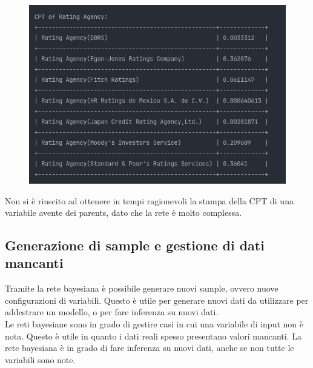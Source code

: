 \begin{figure}[H]
    \centering
    \includegraphics[scale=0.6]{img/cpt.png}
\end{figure}
\noindent Non si è riuscito ad ottenere in tempi ragionevoli la stampa della CPT di una variabile avente dei parents, dato che la rete è molto complessa.

\subsection{Generazione di sample e gestione di dati mancanti}
\noindent Tramite la rete bayesiana è possibile generare nuovi sample, ovvero nuove configurazioni di variabili. Questo è utile per generare nuovi dati da utilizzare per addestrare un modello, o per fare inferenza su nuovi dati.  
\\ Le reti bayesiane sono in grado di gestire casi in cui una variabile di input non è nota. Questo è utile in quanto i dati reali spesso presentano valori mancanti. La rete bayesiana è in grado di fare inferenza su nuovi dati, anche se non tutte le variabili sono note.

